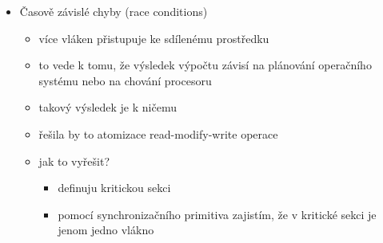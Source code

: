 \begin{itemize}
\begin{itemize}
\begin{itemize}
\end{itemize}
\item file links
\begin{itemize}
\item links (hard links)
\begin{itemize}
\item více adresářových záznamů odkazuje na stejný fyzický soubor
\item většina operací je transparentních
\item šetří místo, ale může dělat problémy (smazání hardlinku nesmí smazat fyzický soubor - takže OS musí počítat odkazy na daný soubor)
\end{itemize}
\item symlinks (soft links)
\begin{itemize}
\item symlinky jsou speciální soubory, v nichž je uložená cesta jiného souboru
\end{itemize}
\end{itemize}
\item file system
\begin{itemize}
\item řeší překlad jmen, správu datových bloků, správu dat souborů
\item pro file system je jednotkou jeden blok, blok je určitý počet sektorů
\item řeší abstrakci práce se soubory a adresáři
\item může být lokální (FAT, NTFS) nebo síťový (NFS, CIFS/SMB)
\end{itemize}
\end{itemize}
\item Časově závislé chyby (race conditions)
\begin{itemize}
\item více vláken přistupuje ke sdílenému prostředku
\item to vede k tomu, že výsledek výpočtu závisí na plánování operačního systému nebo na chování procesoru
\item takový výsledek je k ničemu
\item řešila by to atomizace read-modify-write operace
\item jak to vyřešit?
\begin{itemize}
\item definuju kritickou sekci
\item pomocí synchronizačního primitiva zajistím, že v kritické sekci je jenom jedno vlákno
\end{itemize}

\end{itemize}
\end{itemize}
